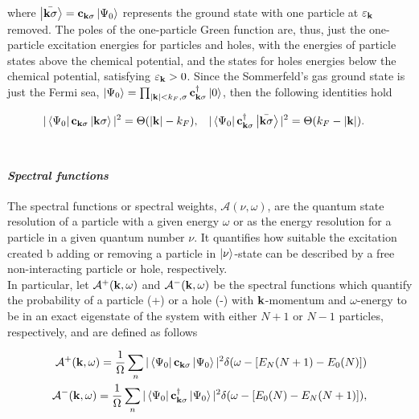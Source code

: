 \documentclass{homework}
\begin{document}
where $\ket{\bar{{\bf k} \sigma}} = {{\bf c}}_{{\bf k} \sigma}\ket{\Psi_0}$ represents the ground state with one particle at $\varepsilon_{{\bf k}}$ removed. The poles of the one-particle Green function are, thus, just the one-particle excitation energies for particles and holes, with the energies of particle states above the chemical potential, and the states for holes energies below the chemical potential, satisfying $\varepsilon_{{\bf k}} > 0$. Since the Sommerfeld's gas ground state is just the Fermi sea, $\ket{\Psi_0} = \prod_{|{\bf k}| < k_F, \sigma} {\bf c}^\dagger_{{\bf k} \sigma} \ket{0}$, then the following identities hold 

\begin{align}
    |\bra{\Psi_0} {{\bf c}}_{{\bf k} \sigma} \ket{{\bf k} \sigma}|^2 &= \Theta(|{\bf k}| - k_F), & |\bra{\Psi_0} {{\bf c}}^\dagger_{{\bf k} \sigma} \ket{\bar{{\bf k} \sigma}}|^2 &= \Theta( k_F - |{\bf k}|). 
\end{align}\\

\paragraph{\textit{Spectral functions}}

The spectral functions or spectral weights, $\mathcal{A}(\nu, \omega)$, are the quantum state resolution of a particle with a given energy $\omega$ or as the energy resolution for a particle in a given quantum number $\nu$. It quantifies how suitable the excitation created b adding or removing a particle in $\ket{\nu}$-state can be described by a free non-interacting particle or hole, respectively. \\

In particular, let $\mathcal{A}^{+}({\bf k}, \omega)$ and $\mathcal{A}^{-}({\bf k}, \omega)$ be the spectral functions which quantify the probability of a particle (+) or a hole (-) with ${\bf k}$-momentum and $\omega$-energy to be in an exact eigenstate of the system with either $N+1$ or $N-1$ particles, respectively, and are defined as follows 

\begin{equation}
    \begin{split}
        \mathcal{A}^{+}({\bf k}, \omega) = \frac{1}{\Omega} \sum_{n} |\bra{\Psi_0} {{\bf c}}_{{\bf k} \sigma} \ket{\Psi_0}|^2 \delta(\omega - [E_N(N+1) - E_0(N)]) \\
        \mathcal{A}^{-}({\bf k}, \omega) = \frac{1}{\Omega} \sum_{n} |\bra{\Psi_0} {{\bf c}}_{{\bf k}\sigma}^\dagger \ket{\Psi_0}|^2 \delta(\omega - [E_0(N) - E_N(N+1)]),
    \end{split}
\end{equation}
\end{document}
